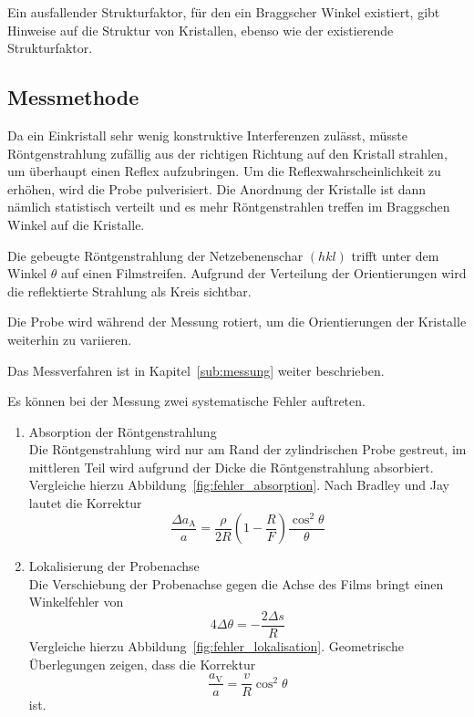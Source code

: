 Ein ausfallender Strukturfaktor, für den ein Braggscher Winkel existiert,
gibt Hinweise auf die Struktur von Kristallen,
ebenso wie der existierende Strukturfaktor.


\subsection{Messmethode}
Da ein Einkristall sehr wenig konstruktive Interferenzen zulässt,
müsste Röntgenstrahlung zufällig aus der richtigen Richtung auf den Kristall
strahlen, um überhaupt einen Reflex aufzubringen.
Um die Reflexwahrscheinlichkeit zu erhöhen, wird die Probe pulverisiert.
Die Anordnung der Kristalle ist dann nämlich statistisch verteilt
und es mehr Röntgenstrahlen treffen im Braggschen Winkel auf die Kristalle.

Die gebeugte Röntgenstrahlung der Netzebenenschar $(hkl)$ trifft unter
dem Winkel $\theta$ auf einen Filmstreifen.
Aufgrund der Verteilung der Orientierungen wird die reflektierte Strahlung
als Kreis sichtbar.

Die Probe wird während der Messung rotiert, um die Orientierungen der Kristalle
weiterhin zu variieren.

Das Messverfahren ist in Kapitel~\ref{sub:messung} weiter beschrieben.

Es können bei der Messung zwei systematische Fehler auftreten.
\begin{enumerate}
  \item\label{item:absorption} Absorption der Röntgenstrahlung \\
    Die Röntgenstrahlung wird nur am Rand der zylindrischen Probe gestreut,
    im mittleren Teil wird aufgrund der Dicke die Röntgenstrahlung absorbiert.
    Vergleiche hierzu Abbildung~\ref{fig:fehler_absorption}.
    Nach Bradley und Jay\cite{bradleyjay} lautet die Korrektur
    \begin{equation}
      \label{eq:korrektur_lokalisation}
      \frac{\Delta a_\text{A}}{a} = \frac{\rho}{2R}\left(1 - \frac{R}{F}\right) \frac{\cos^2\!\theta}{\theta}
    \end{equation}
  \item\label{item:lokalisierung} Lokalisierung der Probenachse \\
    Die Verschiebung der Probenachse gegen die Achse des Films bringt
    einen Winkelfehler von
    \begin{equation}
      4 \Delta \theta = -\frac{2 \Delta s}{R}
    \end{equation}
    Vergleiche hierzu Abbildung~\ref{fig:fehler_lokalisation}.
    Geometrische Überlegungen zeigen, dass die Korrektur
    \begin{equation}
      \frac{a_\text{V}}{a} = \frac{v}{R} \cos^2\!{\theta}
    \end{equation}
    ist.
\end{enumerate}

